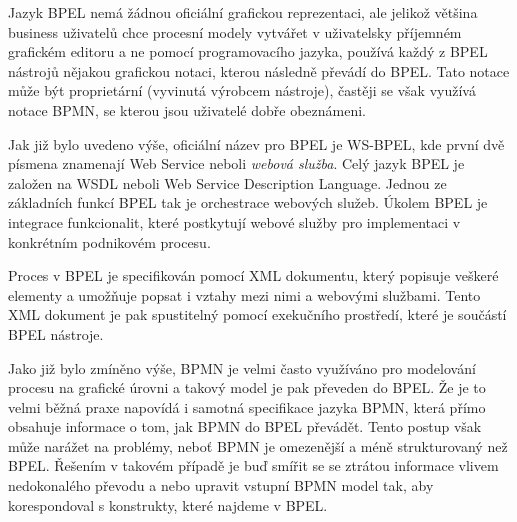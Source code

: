 \documentclass[]{article}
\begin{document}
Jazyk BPEL nemá žádnou oficiální grafickou reprezentaci, ale jelikož většina business uživatelů chce procesní modely vytvářet v uživatelsky příjemném grafickém editoru a ne pomocí programovacího jazyka, používá každý z BPEL nástrojů nějakou grafickou notaci, kterou následně převádí do BPEL. Tato notace může být proprietární (vyvinutá výrobcem nástroje), častěji se však využívá notace BPMN, se kterou jsou uživatelé dobře obeznámeni.

Jak již bylo uvedeno výše, oficiální název pro BPEL je WS-BPEL, kde první dvě písmena znamenají Web Service neboli \textit{webová služba}. Celý jazyk BPEL je založen na WSDL neboli Web Service Description Language. Jednou ze základních funkcí BPEL tak je orchestrace webových služeb. Úkolem BPEL je integrace funkcionalit, které postkytují webové služby pro implementaci v konkrétním podnikovém procesu.

Proces v BPEL je specifikován pomocí XML dokumentu, který popisuje veškeré elementy a umožňuje popsat i vztahy mezi nimi a webovými službami. Tento XML dokument je pak spustitelný pomocí exekučního prostředí, které je součástí BPEL nástroje.

Jako již bylo zmíněno výše, BPMN je velmi často využíváno pro modelování procesu na grafické úrovni a takový model je pak převeden do BPEL. Že je to velmi běžná praxe napovídá i samotná specifikace jazyka BPMN, která přímo obsahuje informace o tom, jak BPMN do BPEL převádět. Tento postup však může narážet na problémy, neboť BPMN je omezenější a méně strukturovaný než BPEL. Řešením v takovém případě je buď smířit se se ztrátou informace vlivem nedokonalého převodu a nebo upravit vstupní BPMN model tak, aby korespondoval s konstrukty, které najdeme v BPEL. \cite{Cerny2010}


\nocite{*}


\end{document}
